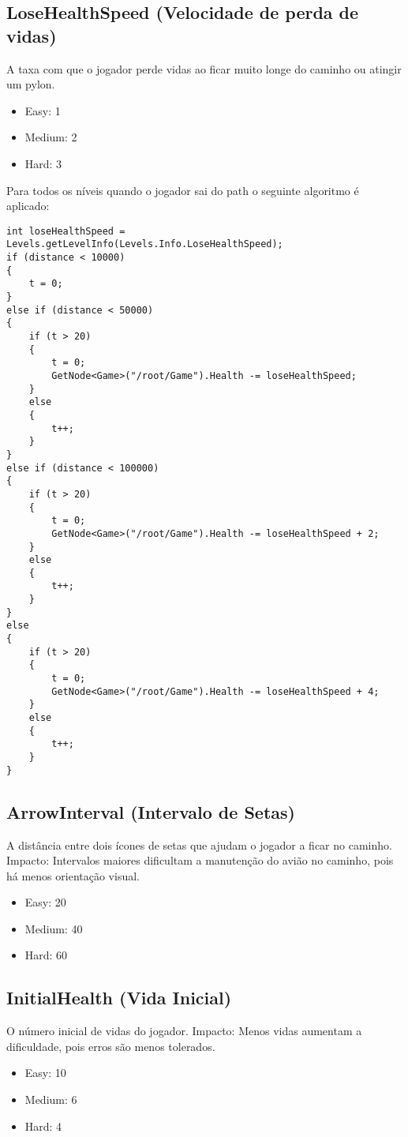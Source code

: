 \subsection*{LoseHealthSpeed (Velocidade de perda de vidas)}
A taxa com que o jogador perde vidas ao ficar muito longe do caminho ou atingir um pylon.
\begin{itemize}
    \item Easy: 1
    \item Medium: 2
    \item Hard: 3
\end{itemize}

Para todos os níveis quando o jogador sai do path o seguinte algoritmo é aplicado:

\begin{verbatim}
int loseHealthSpeed = Levels.getLevelInfo(Levels.Info.LoseHealthSpeed);
if (distance < 10000)
{
    t = 0;
}
else if (distance < 50000)
{
    if (t > 20)
    {
        t = 0;
        GetNode<Game>("/root/Game").Health -= loseHealthSpeed;
    }
    else
    {
        t++;
    }
}
else if (distance < 100000)
{
    if (t > 20)
    {
        t = 0;
        GetNode<Game>("/root/Game").Health -= loseHealthSpeed + 2;
    }
    else
    {
        t++;
    }
}
else
{
    if (t > 20)
    {
        t = 0;
        GetNode<Game>("/root/Game").Health -= loseHealthSpeed + 4;
    }
    else
    {
        t++;
    }
}
\end{verbatim}

\subsection*{ArrowInterval (Intervalo de Setas)}
A distância entre dois ícones de setas que ajudam o jogador a ficar no caminho.
Impacto: Intervalos maiores dificultam a manutenção do avião no caminho, pois há menos orientação visual.
\begin{itemize}
    \item Easy: 20
    \item Medium: 40
    \item Hard: 60
\end{itemize}

\subsection*{InitialHealth (Vida Inicial)}
O número inicial de vidas do jogador.
Impacto: Menos vidas aumentam a dificuldade, pois erros são menos tolerados.
\begin{itemize}
    \item Easy: 10
    \item Medium: 6
    \item Hard: 4
\end{itemize}

